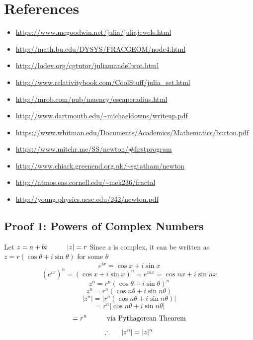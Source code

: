 \documentclass[12pt]{article}
\begin{document}
\section*{References}
\begin{itemize}
	\item\url{https://www.mcgoodwin.net/julia/juliajewels.html}
	\item\url{http://math.bu.edu/DYSYS/FRACGEOM/node4.html}
	\item\url{http://lodev.org/cgtutor/juliamandelbrot.html}
	\item\url{http://www.relativitybook.com/CoolStuff/julia_set.html}
	\item\url{http://mrob.com/pub/muency/escaperadius.html}
	\item\url{http://www.dartmouth.edu/~michaeldowns/writeup.pdf}
	\item\url{https://www.whitman.edu/Documents/Academics/Mathematics/burton.pdf}
	\item\url{https://www.mitchr.me/SS/newton/#firstprogram}
	\item\url{http://www.chiark.greenend.org.uk/~sgtatham/newton}
	\item\url{http://atmos.eas.cornell.edu/~mek236/fractal}
	\item\url{http://young.physics.ucsc.edu/242/newton.pdf}
\end{itemize}
\subsection*{Proof 1: Powers of Complex Numbers}
\begin{center}
	Let $z= a + bi\hspace{10mm}|z|=r$\linebreak
	Since $z$ is complex, it can be written as $z=r(\cos\theta+i\sin\theta)$ for some $\theta$
	$$e^{ix} = \cos x+i\sin x$$
	$$(e^{ix})^n = (\cos x+i\sin x)^n = e^{nix} = \cos nx+i\sin nx$$
	$$z^n=r^n(\cos\theta+i\sin\theta)^n$$
	$$z^n=r^n(\cos n\theta+i\sin n\theta)$$
	$$|z^n|=|r^n(\cos n\theta+i\sin n\theta)|$$
	$$ = r^n|\cos n\theta+i\sin n\theta|$$
	$$ = r^n\hspace{10mm}\text{via Pythagorean Theorem}$$
	$$\huge\therefore\normalsize\hspace{5mm}|z^n|=|z|^n$$
\end{center}
\end{document}

